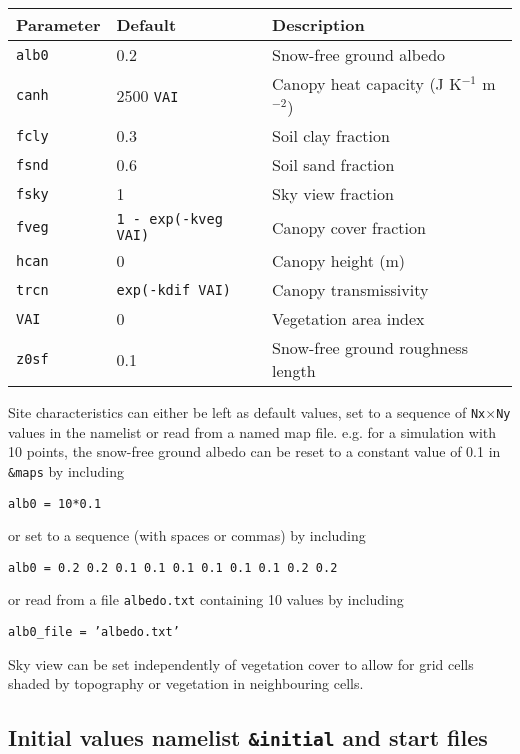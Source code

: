 \documentclass{article}
\begin{document}
\begin{longtable}{|l|l|l|}
\hline
Parameter & Default & Description \\
\hline
{\tt alb0}  & 0.2             & Snow-free ground albedo                    \\
{\tt canh}  & 2500 {\tt VAI}  & Canopy heat capacity (J K$^{-1}$ m$^{-2}$) \\
{\tt fcly}  & 0.3             & Soil clay fraction                         \\
{\tt fsnd}  & 0.6             & Soil sand fraction                         \\
{\tt fsky}  & 1               & Sky view fraction                          \\
{\tt fveg}  & {\tt 1 - exp(-kveg VAI)}  & Canopy cover fraction            \\
{\tt hcan}  & 0               & Canopy height (m)                          \\
{\tt trcn}  & {\tt exp(-kdif VAI)}  & Canopy transmissivity                \\
{\tt VAI}   & 0               & Vegetation area index                      \\
{\tt z0sf}  & 0.1             & Snow-free ground roughness length          \\
\hline 
\end{longtable}

Site characteristics can either be left as default values, set to a sequence of {\tt Nx$\times$Ny} values in the namelist or read from a named map file. e.g. for a simulation with 10 points, the snow-free ground albedo can be reset to a constant value of 0.1 in {\tt \&maps} by including

{\tt alb0 = 10*0.1}

or set to a sequence (with spaces or commas) by including

{\tt alb0 = 0.2 0.2 0.1 0.1 0.1 0.1 0.1 0.1 0.2 0.2} 

or read from a file {\tt albedo.txt} containing 10 values by including

{\tt alb0\_file = 'albedo.txt'}

Sky view can be set independently of vegetation cover to allow for grid cells shaded by topography or vegetation in neighbouring cells.

\subsection{Initial values namelist {\tt \&initial} and start files}
\end{document}
